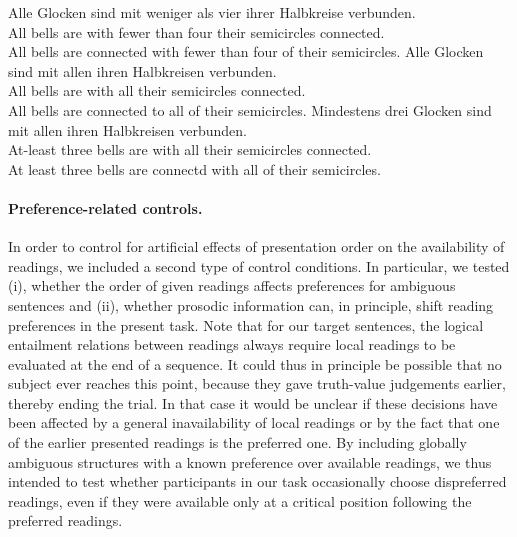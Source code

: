 \documentclass[fleqn,reqno,10pt,draft]{article}
\begin{document}
\begin{exe}
\ex \label{bsp:controls-es}
  \begin{xlist}
\ex \label{bsp:controls-es-1} \gll Alle Glocken sind mit weniger als
  vier ihrer Halbkreise verbunden. \\ 
All bells are with fewer than four their semicircles connected.\\
\trans All bells are connected with fewer than four of their semicircles.  
\ex \label{bsp:controls-es-2} \gll Alle Glocken sind mit allen ihren Halbkreisen verbunden.\\
All bells are with all their semicircles connected.\\
\trans All bells are connected to all of their semicircles. 
\ex \label{bsp:controls-es-3} \gll Mindestens drei Glocken sind mit
  allen ihren Halbkreisen verbunden.\\ 
  At-least three bells are with all  their semicircles connected.\\
  \trans At least three bells are connectd with all of their semicircles.
\end{xlist}
\end{exe}

\paragraph{Preference-related controls.} In order to control for
artificial effects of presentation order on the availability of
readings, we included a second type of control conditions. In
particular, we tested (i), whether the order of given readings affects
preferences for ambiguous sentences and (ii), whether prosodic
information can, in principle, shift reading preferences in the
present task. Note that for our target sentences, the logical
entailment relations between readings always require local readings to
be evaluated at the end of a sequence. It could thus in principle be
possible that no subject ever reaches this point, because they gave
truth-value judgements earlier, thereby ending the trial. In that case
it would be unclear if these decisions have been affected by a general
inavailability of local readings or by the fact that one of the
earlier presented readings is the preferred one. By including globally
ambiguous structures with a known preference over available readings,
we thus intended to test whether participants in our task occasionally
choose dispreferred readings, even if they were available only at a critical
position following the preferred readings.
\end{document}
